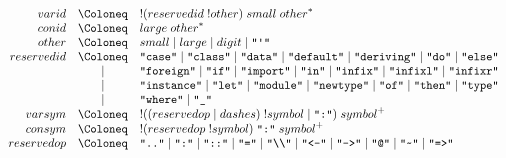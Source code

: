 \begin{align*}
\begin{array}{rcl}
    {varid}
    & \Coloneq & ! ({reservedid}\; !{other})\; {small}\; {other}^*
    \\
    {conid}
    & \Coloneq & {large}\; {other}^*
    \\
    {other}
    & \Coloneq & {small}
    \mid {large}
    \mid {digit}
    \mid \text{\texttt{\textquotedbl\textquotesingle\textquotedbl}}
    \\
    {reservedid}
    & \Coloneq & \text{\texttt{\textquotedbl case\textquotedbl}}
    \mid \text{\texttt{\textquotedbl class\textquotedbl}}
    \mid \text{\texttt{\textquotedbl data\textquotedbl}}
    \mid \text{\texttt{\textquotedbl default\textquotedbl}}
    \mid \text{\texttt{\textquotedbl deriving\textquotedbl}}
    \mid \text{\texttt{\textquotedbl do\textquotedbl}}
    \mid \text{\texttt{\textquotedbl else\textquotedbl}}
    \\
    & \mid & \text{\texttt{\textquotedbl foreign\textquotedbl}}
    \mid \text{\texttt{\textquotedbl if\textquotedbl}}
    \mid \text{\texttt{\textquotedbl import\textquotedbl}}
    \mid \text{\texttt{\textquotedbl in\textquotedbl}}
    \mid \text{\texttt{\textquotedbl infix\textquotedbl}}
    \mid \text{\texttt{\textquotedbl infixl\textquotedbl}}
    \mid \text{\texttt{\textquotedbl infixr\textquotedbl}}
    \\
    & \mid & \text{\texttt{\textquotedbl instance\textquotedbl}}
    \mid \text{\texttt{\textquotedbl let\textquotedbl}}
    \mid \text{\texttt{\textquotedbl module\textquotedbl}}
    \mid \text{\texttt{\textquotedbl newtype\textquotedbl}}
    \mid \text{\texttt{\textquotedbl of\textquotedbl}}
    \mid \text{\texttt{\textquotedbl then\textquotedbl}}
    \mid \text{\texttt{\textquotedbl type\textquotedbl}}
    \\
    & \mid & \text{\texttt{\textquotedbl where\textquotedbl}}
    \mid \text{\texttt{\textquotedbl\textunderscore\textquotedbl}}
    \\
    {varsym}
    & \Coloneq & {!} (({reservedop} \mid {dashes})\; !{symbol} \mid \text{\texttt{\textquotedbl :\textquotedbl}})\; {symbol}^+
    \\
    {consym}
    & \Coloneq & {!} ({reservedop}\; !{symbol})\; \text{\texttt{\textquotedbl :\textquotedbl}}\; {symbol}^+
    \\
    {reservedop}
    & \Coloneq & \text{\texttt{\textquotedbl ..\textquotedbl}}
    \mid \text{\texttt{\textquotedbl :\textquotedbl}}
    \mid \text{\texttt{\textquotedbl ::\textquotedbl}}
    \mid \text{\texttt{\textquotedbl =\textquotedbl}}
    \mid \text{\texttt{\textquotedbl \textbackslash\textbackslash\textquotedbl}}
    \mid \text{\texttt{\textquotedbl <-\textquotedbl}}
    \mid \text{\texttt{\textquotedbl ->\textquotedbl}}
    \mid \text{\texttt{\textquotedbl @\textquotedbl}}
    \mid \text{\texttt{\textquotedbl \textasciitilde\textquotedbl}}
    \mid \text{\texttt{\textquotedbl =>\textquotedbl}}
  \end{array}
\end{align*}

